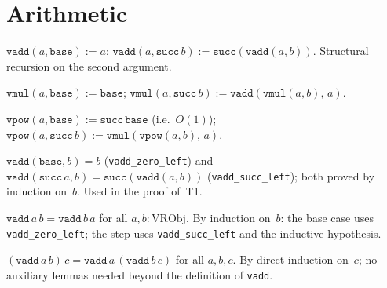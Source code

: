 \section{Arithmetic}
\label{sec:vr_arith}

\begin{definition}
\label{def:vadd}
\leanok
{}
$\texttt{vadd}(a, \texttt{base}) := a$;\quad
$\texttt{vadd}(a, \texttt{succ}\,b) := \texttt{succ}(\texttt{vadd}(a, b))$.
Structural recursion on the second argument.
\end{definition}

\begin{definition}
\label{def:vmul}
\leanok
{}
$\texttt{vmul}(a, \texttt{base}) := \texttt{base}$;\quad
$\texttt{vmul}(a, \texttt{succ}\,b) := \texttt{vadd}(\texttt{vmul}(a,b),\,a)$.
\end{definition}

\begin{definition}
\label{def:vpow}
\leanok
{}
$\texttt{vpow}(a, \texttt{base}) := \texttt{succ}\,\texttt{base}$ (i.e.~$O(1)$);\quad
$\texttt{vpow}(a, \texttt{succ}\,b) := \texttt{vmul}(\texttt{vpow}(a,b),\,a)$.
\end{definition}

\begin{lemma}
\label{lem:vadd_aux}
\leanok
{}
$\texttt{vadd}(\texttt{base}, b) = b$ (\texttt{vadd\_zero\_left}) and
$\texttt{vadd}(\texttt{succ}\,a, b) = \texttt{succ}(\texttt{vadd}(a, b))$
(\texttt{vadd\_succ\_left}); both proved by induction on~$b$.  Used in
the proof of~T1.
\end{lemma}

\begin{theorem}
\label{thm:T1}
\leanok
{}
$\texttt{vadd}\,a\,b = \texttt{vadd}\,b\,a$ for all $a, b :
\mathrm{VRObj}$.  By induction on~$b$: the base case uses
\texttt{vadd\_zero\_left}; the step uses \texttt{vadd\_succ\_left} and
the inductive hypothesis.
\end{theorem}

\begin{theorem}
\label{thm:T2}
\leanok
{}
$(\texttt{vadd}\,a\,b)\,c = \texttt{vadd}\,a\,(\texttt{vadd}\,b\,c)$
for all $a, b, c$.  By direct induction on~$c$; no auxiliary lemmas
needed beyond the definition of \texttt{vadd}.
\end{theorem}


